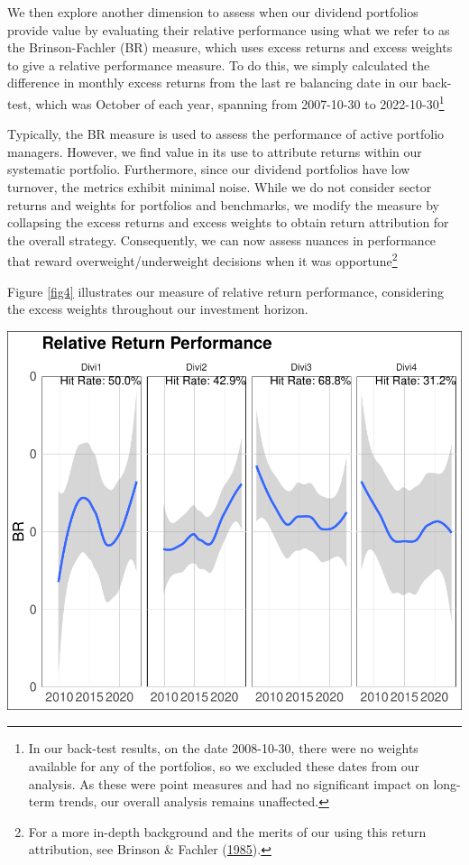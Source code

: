\documentclass[10pt,preprint, authoryear]{elsarticle}
\let\origfigure\figure
\let\endorigfigure\endfigure
\renewenvironment{figure}[1][2] {
    \expandafter\origfigure\expandafter[H]
} {
    \endorigfigure
}
\numberwithin{equation}{section}
\numberwithin{figure}{section}
\numberwithin{table}{section}
\let\rmarkdownfootnote\footnote%
\def\footnote{\protect\rmarkdownfootnote}
\begin{document}
We then explore another dimension to assess when our dividend portfolios
provide value by evaluating their relative performance using what we
refer to as the Brinson-Fachler (BR) measure, which uses excess returns
and excess weights to give a relative performance measure. To do this,
we simply calculated the difference in monthly excess returns from the
last re balancing date in our back-test, which was October of each year,
spanning from 2007-10-30 to 2022-10-30\footnote{In our back-test
  results, on the date 2008-10-30, there were no weights available for
  any of the portfolios, so we excluded these dates from our analysis.
  As these were point measures and had no significant impact on
  long-term trends, our overall analysis remains unaffected.}

Typically, the BR measure is used to assess the performance of active
portfolio managers. However, we find value in its use to attribute
returns within our systematic portfolio. Furthermore, since our dividend
portfolios have low turnover, the metrics exhibit minimal noise. While
we do not consider sector returns and weights for portfolios and
benchmarks, we modify the measure by collapsing the excess returns and
excess weights to obtain return attribution for the overall strategy.
Consequently, we can now assess nuances in performance that reward
overweight/underweight decisions when it was opportune\footnote{For a
  more in-depth background and the merits of our using this return
  attribution, see Brinson \& Fachler
  (\protect\hyperlink{ref-brinson1985measuring}{1985}).}

Figure \ref{fig4} illustrates our measure of relative return
performance, considering the excess weights throughout our investment
horizon.

\begin{figure}[H]

\includegraphics{Much_Ado_About_Dividends_files/figure-latex/unnamed-chunk-5-1} \hfill{}

\caption{Rolling 3 Year Returns \label{fig4}}\label{fig:unnamed-chunk-5}
\end{figure}
\end{document}
